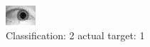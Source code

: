 \begin{figure}[h!]
\begin{center}
\includegraphics[width=0.60\columnwidth]{figures/ID1467_class_2_target_1.png}
\end{center}
\caption{ Classification: 2 actual target: 1}
\label{fig:ID1467_class_2_target_1}
\end{figure}
